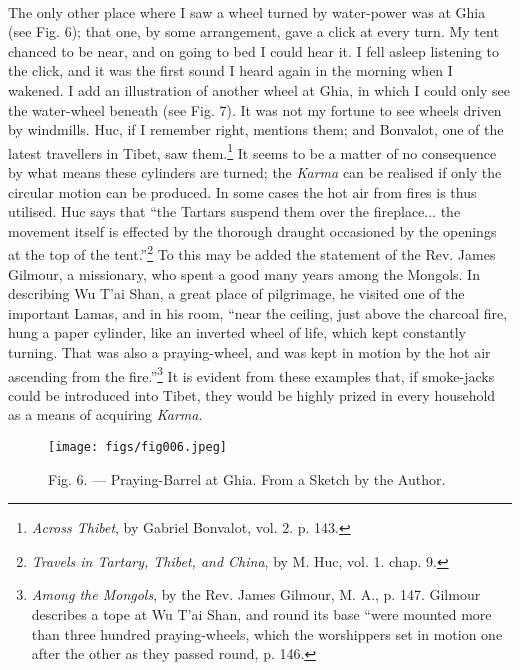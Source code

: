 \documentclass[a4paper, 11pt, oneside, polutonikogreek, english]{article}
\begin{document}
\paragraph{}
The only other place where I saw a wheel turned by water-power was at Ghia (see Fig. 6); that one, by some arrangement, gave a click at every turn. My tent chanced to be near, and on going to bed I could hear it. I fell asleep listening to the click, and it was the first sound I heard again in the morning when I wakened. I add an illustration of another wheel at Ghia, in which I could only see the water-wheel beneath (see Fig. 7). It was not my fortune to see wheels driven by windmills. Huc, if I remember right, mentions them; and Bonvalot, one of the latest travellers in Tibet, saw them.\footnote{\emph{Across Thibet}, by Gabriel Bonvalot, vol. 2. p. 143.} It seems to be a matter of no consequence by what means these cylinders are turned; the \emph{Karma} can be realised if only the circular motion can be produced. In some cases the hot air from fires is thus utilised. Huc says that ``the Tartars suspend them over the fireplace... the movement itself is effected by the thorough draught occasioned by the openings at the top of the tent.''\footnote{\emph{Travels in Tartary, Thibet, and China}, by M. Huc, vol. 1. chap. 9.} To this may be added the statement of the Rev. James Gilmour, a missionary, who spent a good many years among the Mongols. In describing Wu T'ai Shan, a great place of pilgrimage, he visited one of the important Lamas, and in his room, ``near the ceiling, just above the charcoal fire, hung a paper cylinder, like an inverted wheel of life, which kept constantly turning. That was also a praying-wheel, and was kept in motion by the hot air ascending from the fire.''\footnote{\emph{Among the Mongols}, by the Rev. James Gilmour, M. A., p. 147. Gilmour describes a tope at Wu T'ai Shan, and round its base ``were mounted more than three hundred praying-wheels, which the worshippers set in motion one after the other as they passed round, p. 146.} It is evident from these examples that, if smoke-jacks could be introduced into Tibet, they would be highly prized in every household as a means of acquiring \emph{Karma}.

\begin{figure}[H]
\centering
\texttt{[image: figs/fig006.jpeg]}
\caption{Fig. 6. --- Praying-Barrel at Ghia. From a Sketch by the Author.}
\end{figure}
\end{document}
